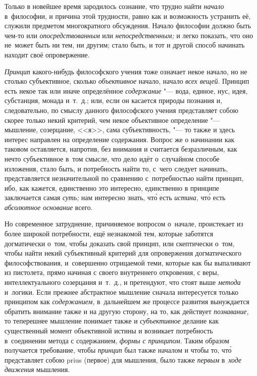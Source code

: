 Только в новейшее время зародилось сознание, что трудно найти {\em начало}
в~философии, и причина этой трудности,
равно как и возможность устранить её, служили предметом
многократного обсуждения. Начало философии должно быть чем-то или {\em
опосредствованным} или {\em непосредственным;} и легко показать, что оно
не~может быть ни тем, ни другим; стало быть, и тот и другой способ начинать
находит своё опровержение.

{\em Принцип} какого-нибудь философского учения тоже означает некое начало, но
не столько субъективное, сколько {\em объективное} начало, начало
{\em всех вещей}. Принцип есть некое так или иначе определённое
{\em содержание} "--- вода, единое, нус, идея, субстанция,
монада и~т.~д.; или, если он касается природы познания и, следовательно, по
смыслу данного философского учения представляет собою скорее только некий
критерий, чем некое объективное определение "--- мышление, созерцание, <<я>>,
сама субъективность, "--- то также и здесь интерес направлен на определение
содержания. Вопрос же о начинании как таковом оставляется, напротив, без
внимания и считается безразличным, как нечто субъективное в~том смысле, что
дело идёт о~случайном способе изложения, стало быть, и потребность найти то,
с~чего следует начинать, представляется незначительной по сравнению
с~потребностью найти принцип, ибо, как кажется, единственно это интересно,
единственно в принципе заключается самая {\em суть;} нам интересно знать,
чт\'{о} есть {\em истина,} чт\'{о} есть {\em абсолютное основание} всего.

Но современное затруднение, причиняемое вопросом о~начале, проистекает из более
широкой потребности, ещё незнакомой тем, которые заботятся догматически о~том,
чтобы доказать свой принцип, или скептически о~том, чтобы найти некий
субъективный критерий для опровержения догматического философствования,
и~совершенно отрицаемой теми, которые как бы выпаливают из пистолета, прямо
начиная с своего внутреннего откровения, с веры, интеллектуального созерцания
и~т.~д., и претендуют, что стоят выше {\em метода} и~логики. Если прежнее
абстрактное мышление сначала интересуется только принципом как
{\em содержанием,} в~дальнейшем же процессе развития вынуждается обратить
внимание также и на другую сторону, на то, как действует {\em познавание,}
то теперешнее мышление понимает также и {\em субъективное} делание как
существенный момент объективной истины и возникает потребность в~соединении
метода с содержанием, {\em формы с принципом}. Таким образом получается
требование, чтобы {\em принцип} был также началом и чтобы то, чт\'{о}
представляет собою prius (первое) для мышления, было также {\em первым}
в~{\em ходе движения} мышления.


